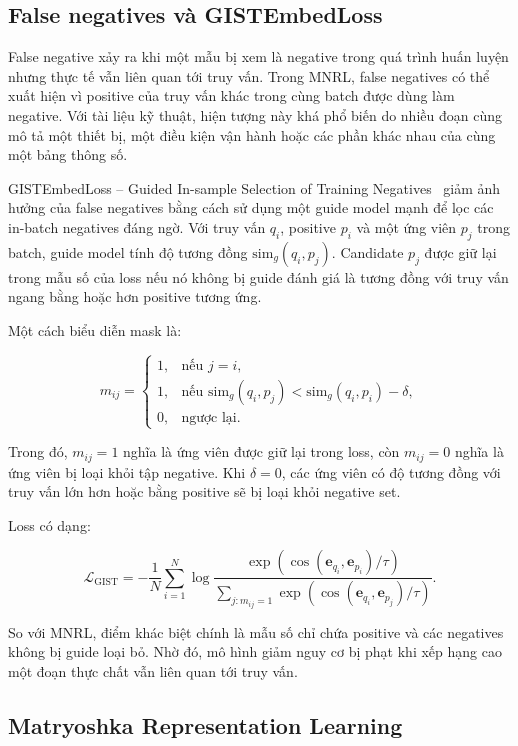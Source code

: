 \documentclass[../DoAn.tex]{subfiles}
\begin{document}
\subsection{False negatives và GISTEmbedLoss}
\label{subsection:2.4.4}

False negative xảy ra khi một mẫu bị xem là negative trong quá trình huấn luyện nhưng thực tế vẫn liên quan tới truy vấn. Trong MNRL, false negatives có thể xuất hiện vì positive của truy vấn khác trong cùng batch được dùng làm negative. Với tài liệu kỹ thuật, hiện tượng này khá phổ biến do nhiều đoạn cùng mô tả một thiết bị, một điều kiện vận hành hoặc các phần khác nhau của cùng một bảng thông số.

GISTEmbedLoss -- Guided In-sample Selection of Training Negatives~\cite{solatorio2024gistembed} giảm ảnh hưởng của false negatives bằng cách sử dụng một guide model mạnh để lọc các in-batch negatives đáng ngờ. Với truy vấn $q_i$, positive $p_i$ và một ứng viên $p_j$ trong batch, guide model tính độ tương đồng $\mathrm{sim}_g(q_i,p_j)$. Candidate $p_j$ được giữ lại trong mẫu số của loss nếu nó không bị guide đánh giá là tương đồng với truy vấn ngang bằng hoặc hơn positive tương ứng.

Một cách biểu diễn mask là:

\[
m_{ij}
=
\begin{cases}
1, & \text{nếu } j=i,\\
1, & \text{nếu } \mathrm{sim}_g(q_i,p_j) < \mathrm{sim}_g(q_i,p_i)-\delta,\\
0, & \text{ngược lại}.
\end{cases}
\]

Trong đó, $m_{ij}=1$ nghĩa là ứng viên được giữ lại trong loss, còn $m_{ij}=0$ nghĩa là ứng viên bị loại khỏi tập negative. Khi $\delta=0$, các ứng viên có độ tương đồng với truy vấn lớn hơn hoặc bằng positive sẽ bị loại khỏi negative set.

Loss có dạng:

\[
\mathcal{L}_{\mathrm{GIST}}
=
-\frac{1}{N}
\sum_{i=1}^{N}
\log
\frac{
\exp
\left(
\cos(\mathbf{e}_{q_i},\mathbf{e}_{p_i})/\tau
\right)
}{
\sum_{j:m_{ij}=1}
\exp
\left(
\cos(\mathbf{e}_{q_i},\mathbf{e}_{p_j})/\tau
\right)
}.
\]

So với MNRL, điểm khác biệt chính là mẫu số chỉ chứa positive và các negatives không bị guide loại bỏ. Nhờ đó, mô hình giảm nguy cơ bị phạt khi xếp hạng cao một đoạn thực chất vẫn liên quan tới truy vấn.

\subsection{Matryoshka Representation Learning}
\label{subsection:2.4.5}
\end{document}
